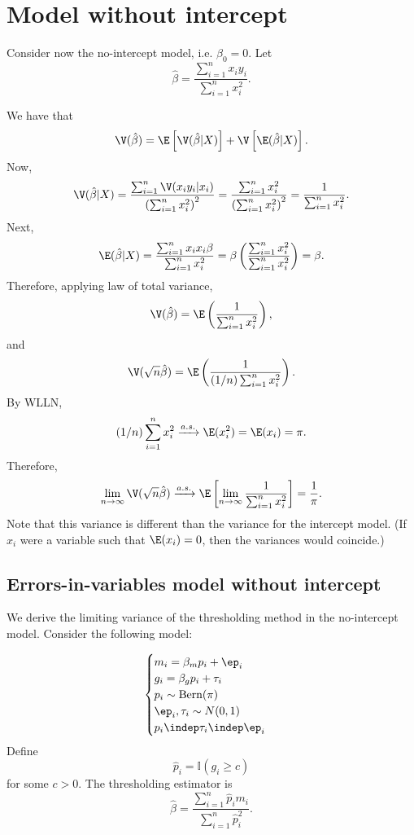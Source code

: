 \documentclass[12pt]{article}
\begin{document}
\section{Model without intercept}

Consider now the no-intercept model, i.e. $\beta_0 = 0.$ Let 
$$ \hat{\beta} = \frac{ \sum_{i=1}^n x_i y_i }{ \sum_{i=1}^n x_i^2}.$$

We have that 
$$ \V(\hat{\beta}) = \E\left[\V(\hat{\beta}|X)\right] + \V \left[ \E ({\hat{\beta}}|X) \right].$$
Now,
$$ \V( \hat{\beta} | X) = \frac{\sum_{i=1}^n \V(x_i y_i | x_i) }{ \left( \sum_{i=1}^n x_i^2 \right)^2} = \frac{ \sum_{i=1}^n x_i^2 }{ \left( \sum_{i=1}^n x_i^2\right)^2 } = \frac{1}{ \sum_{i=1}^n x_i^2 } .$$
Next,
$$\E(\hat{\beta}|X) = \frac{ \sum_{i=1}^n x_i x_i \beta  }{\sum_{i=1}^n x_i^2} = \beta \left( \frac{ \sum_{i=1}^n x_i^2 }{ \sum_{i=1}^n x_i^2} \right) = \beta.$$
Therefore, applying law of total variance,
$$ \V(\hat{\beta}) = \E \left( \frac{ 1 }{ \sum_{i=1}^n x_i^2 } \right),$$ and
$$ \V (\sqrt{n} \hat{\beta}) = \E \left(\frac{1}{(1/n) \sum_{i=1}^n x_i^2}\right).$$ By WLLN,
$$ (1/n) \sum_{i=1}^n x_i^2 \xrightarrow{a.s.} \E(x_i^2) = \E(x_i) = \pi. $$ Therefore,
$$\lim_{n \to \infty} \V(\sqrt{n} \hat{\beta}) \xrightarrow{a.s.} \E \left[ \lim_{n \to \infty} \frac{1}{ \sum_{i=1}^n x_i^2 } \right] = \frac{1}{\pi}.$$ Note that this variance is different than the variance for the intercept model. (If $x_i$ were a variable such that $\E(x_i) = 0$, then the variances would coincide.)

\subsection{Errors-in-variables model without intercept}

We derive the limiting variance of the thresholding method in the no-intercept model. Consider the following model:

$$
\begin{cases}
m_i = \beta_m p_i + \ep_i \\
g_i = \beta_g p_i + \tau_i \\
p_i \sim \textrm{Bern}(\pi) \\
\ep_i, \tau_i \sim N(0,1) \\
p_i \indep \tau_i \indep \ep_i
\end{cases}
$$
Define $$\hat{p}_i = \mathbb{I}\left( g_i \geq c \right)$$ for some $c > 0$. The thresholding estimator is
$$\hat{\beta} = \frac{\sum_{i=1}^n \hat{p}_i m_i}{\sum_{i=1}^n \hat{p}_i^2}.$$
\end{document}
